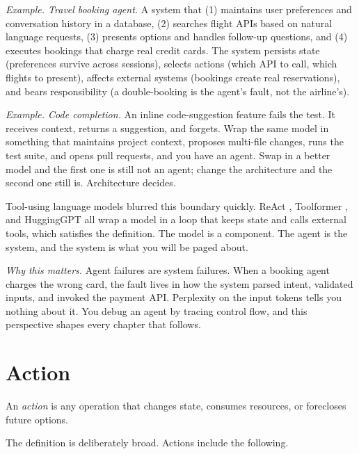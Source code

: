 \textit{Example. Travel booking agent.} A system that (1) maintains user preferences and conversation history in a database, (2) searches flight APIs based on natural language requests, (3) presents options and handles follow-up questions, and (4) executes bookings that charge real credit cards. The system persists state (preferences survive across sessions), selects actions (which API to call, which flights to present), affects external systems (bookings create real reservations), and bears responsibility (a double-booking is the agent's fault, not the airline's).

\textit{Example. Code completion.} An inline code-suggestion feature fails the test. It receives context, returns a suggestion, and forgets. Wrap the same model in something that maintains project context, proposes multi-file changes, runs the test suite, and opens pull requests, and you have an agent. Swap in a better model and the first one is still not an agent; change the architecture and the second one still is. Architecture decides.

Tool-using language models blurred this boundary quickly. ReAct \cite{yao2022react}, Toolformer \cite{schick2023toolformer}, and HuggingGPT \cite{shen2023hugginggpt} all wrap a model in a loop that keeps state and calls external tools, which satisfies the definition. The model is a component. The agent is the system, and the system is what you will be paged about.

\textit{Why this matters.} Agent failures are system failures. When a booking agent charges the wrong card, the fault lives in how the system parsed intent, validated inputs, and invoked the payment API. Perplexity on the input tokens tells you nothing about it. You debug an agent by tracing control flow, and this perspective shapes every chapter that follows.

\section{Action}

An \emph{action} is any operation that changes state, consumes resources, or forecloses future options.

The definition is deliberately broad. Actions include the following.

